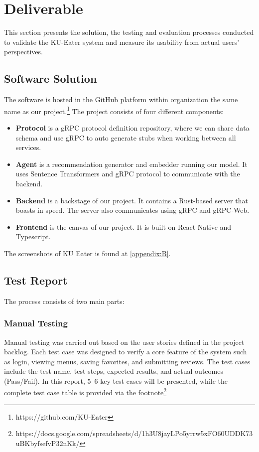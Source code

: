 \chapter{Deliverable}
\label{chap:deliverable}
This section presents the solution, the testing and evaluation processes conducted to validate the KU-Eater system and measure its usability from actual users' perspectives.

\section{Software Solution}
\label{section:software-solution}
The software is hosted in the GitHub platform within organization the same name as our project.\footnote{https://github.com/KU-Eater}
The project consists of four different components:
\begin{itemize}[leftmargin=40pt]
    \item \textbf{Protocol} is a gRPC protocol definition repository, where we can share data schema and use gRPC to auto generate stubs when working between all services.
    \item \textbf{Agent} is a recommendation generator and embedder running our model. It uses Sentence Transformers and gRPC protocol to communicate with the backend.
    \item \textbf{Backend} is a backstage of our project. It contains a Rust-based server that boasts in speed. The server also communicates using gRPC and gRPC-Web.
    \item \textbf{Frontend} is the canvas of our project. It is built on React Native and Typescript.
\end{itemize}

The screenshots of KU Eater is found at \ref{appendix:B}.

\section{Test Report}
\label{section:test-report}
The process consists of two main parts:

\subsection{Manual Testing}
\label{subsection:manual-test}
Manual testing was carried out based on the user stories defined in the project backlog. Each test case was designed to verify a core feature of the system such as login, viewing menus, saving favorites, and submitting reviews. The test cases include the test name, test steps, expected results, and actual outcomes (Pass/Fail). In this report, 5–6 key test cases will be presented, while the complete test case table is provided via the footnote\footnote{https://docs.google.com/spreadsheets/d/1h3U8jayLPo5yrrw5xFO60UDDK73uBKbyfsefvP32nKk/}

